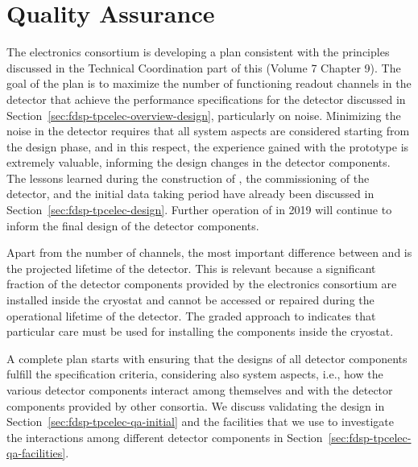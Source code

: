 \section{Quality Assurance}
\label{sec:fdsp-tpcelec-qa}

The  electronics consortium is developing a  plan consistent
with the principles discussed in the Technical Coordination part of this 
 (Volume 7 Chapter 9). %
The goal of the  plan is to maximize the number of functioning
readout channels in the detector that achieve the performance specifications
for the detector discussed in Section~\ref{sec:fdsp-tpcelec-overview-design},
particularly on noise. Minimizing the noise in the detector requires that all
system aspects are considered starting from the design phase, and in this
respect, the experience gained with the  prototype is extremely
valuable, informing the design changes in the detector 
components. The lessons learned during the construction of ,
the commissioning of the detector, and the initial data taking period have
already been discussed in Section~\ref{sec:fdsp-tpcelec-design}. Further
operation of  in 2019 will continue to inform the final design
of the detector components.

Apart from the number of channels, the most important difference
between  and  is the projected lifetime of the detector. This
is relevant because a significant fraction of the detector components provided 
by the  electronics consortium are installed inside the cryostat and cannot 
be accessed or repaired during the operational lifetime of the detector. The 
graded approach to  indicates that particular care must be used for installing 
the  components inside the cryostat.

A complete  plan starts with ensuring that the designs of all
detector components fulfill the specification criteria, considering
also system aspects, i.e., how the various detector components interact
among themselves and with the detector components provided by other 
consortia. We discuss validating the design in 
Section~\ref{sec:fdsp-tpcelec-qa-initial} and the facilities that we use
to investigate the interactions among different detector components
in Section~\ref{sec:fdsp-tpcelec-qa-facilities}. 

